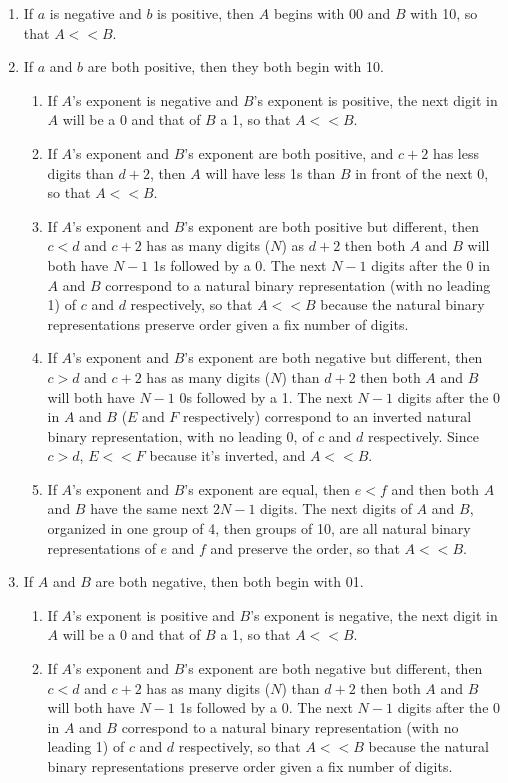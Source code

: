 \documentclass{acm_proc_article-sp}
\begin{document}
\begin{enumerate}
\item If $a$ is negative and $b$ is positive, then $A$ begins with 00 and $B$ with 10, so that $A << B$.
\item If $a$ and $b$ are both positive, then they both begin with 10.
\begin{enumerate}
  \item If $A$'s exponent is negative and $B$'s exponent is positive, the next digit in $A$ will be a 0 and that of $B$ a 1, so that $A << B$.
  \item If $A$'s exponent and $B$'s exponent are both positive, and $c+2$ has less digits than $d+2$, then $A$ will have less 1s than $B$ in front of the next 0, so that $A << B$.
  \item If $A$'s exponent and $B$'s exponent are both positive but different, then $c < d$ and $c+2$ has as many digits ($N$) as $d+2$ then both $A$ and $B$ will both have $N-1$ 1s followed by a 0. The next $N-1$ digits after the 0 in $A$ and $B$ correspond to a natural binary representation (with no leading 1) of $c$ and $d$ respectively, so that $A << B$ because the natural binary representations preserve order given a fix number of digits.
  \item If $A$'s exponent and $B$'s exponent are both negative but different, then $c > d$ and $c+2$ has as many digits ($N$) than $d+2$ then both $A$ and $B$ will both have $N-1$ 0s followed by a 1. The next $N-1$ digits after the 0 in $A$ and $B$ ($E$ and $F$ respectively) correspond to an inverted natural binary representation, with no leading 0, of $c$ and $d$ respectively. Since $c > d$, $E << F$ because it's inverted, and $A << B$.
  \item If $A$'s exponent and $B$'s exponent are equal, then $e < f$ and then both $A$ and $B$ have the same next $2N-1$ digits. The next digits of $A$ and $B$, organized in one group of 4, then groups of 10, are all natural binary representations of $e$ and $f$ and preserve the order, so that $A << B$.
  \end{enumerate}
\item If $A$ and $B$ are both negative, then both begin with 01.
  \begin{enumerate}
  \item If $A$'s exponent is positive and $B$'s exponent is negative, the next digit in $A$ will be a 0 and that of $B$ a 1, so that $A << B$.
  \item If $A$'s exponent and $B$'s exponent are both negative but different, then $c < d$ and $c+2$ has as many digits ($N$) than $d+2$ then both $A$ and $B$ will both have $N-1$ 1s followed by a 0. The next $N-1$ digits after the 0 in $A$ and $B$ correspond to a natural binary representation (with no leading 1) of $c$ and $d$ respectively, so that $A << B$ because the natural binary representations preserve order given a fix number of digits.

\end{enumerate}
\end{enumerate}
\end{document}
